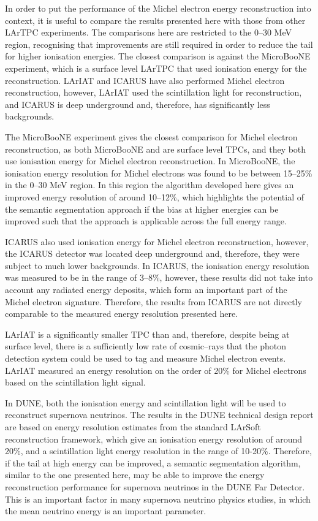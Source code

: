 In order to put the performance of the Michel electron energy
reconstruction into context, it is useful to compare the results presented
here with those from other LArTPC experiments. The comparisons here are
restricted to the 0--30 MeV region, recognising that improvements are still 
required in order to reduce the tail for higher ionisation energies. The closest
comparison is against the MicroBooNE experiment, which is a surface level LArTPC
that used ionisation energy for the reconstruction\cite{Acciarri:2017sjy}. 
LArIAT and ICARUS have also performed Michel electron 
reconstruction\cite{Amoruso:2003sw,Foreman_2016}, however, LArIAT used the 
scintillation light for reconstruction, and ICARUS is deep underground and, 
therefore, has significantly less backgrounds.

The MicroBooNE experiment gives the closest comparison for Michel electron
reconstruction, as both MicroBooNE and \protodune{} are surface level TPCs, and
they both use ionisation energy for Michel electron reconstruction. In
MicroBooNE, the ionisation energy resolution for Michel electrons was found to
be between 15--25\% in the 0--30 MeV region\cite{Acciarri:2017sjy}. In this 
region the algorithm developed here gives an improved energy resolution of 
around 10--12\%, which highlights the potential of the semantic segmentation 
approach if the bias at higher energies can be improved such that the approach
is applicable across the full energy range.

ICARUS also used ionisation energy for Michel electron reconstruction, however,
the ICARUS detector was located deep underground and, therefore, they were
subject to much lower backgrounds. In ICARUS, the ionisation energy resolution
was measured to be in the range of 3--8\%\cite{Amoruso:2003sw}, however, these
results did not take into account any radiated energy deposits, which form an
important part of the Michel electron signature. Therefore, the results from
ICARUS are not directly comparable to the measured energy resolution presented
here.

LArIAT is a significantly smaller TPC than \protodune{} and, therefore, despite
being at surface level, there is a sufficiently low rate of cosmic--rays that the
photon detection system could be used to tag and measure Michel electron events.
LArIAT measured an energy resolution on the order of 20\% for Michel electrons
based on the scintillation light signal\cite{Foreman_2016}.

In DUNE, both the ionisation energy and scintillation light will be used to
reconstruct supernova neutrinos. The results in the DUNE technical design
report are based on energy resolution estimates from the standard
LArSoft reconstruction framework, which give an ionisation energy resolution of
around 20\%, and a scintillation light energy resolution in the range of
10-20\%\cite{Abi:2020evt}. Therefore, if the tail at high energy can be
improved, a semantic segmentation algorithm, similar to the one presented
here, may be able to improve the energy reconstruction performance for
supernova neutrinos in the DUNE Far Detector. This is an important factor in
many supernova neutrino physics studies, in which the mean neutrino energy is an
important parameter\cite{Abi:2020evt}.

